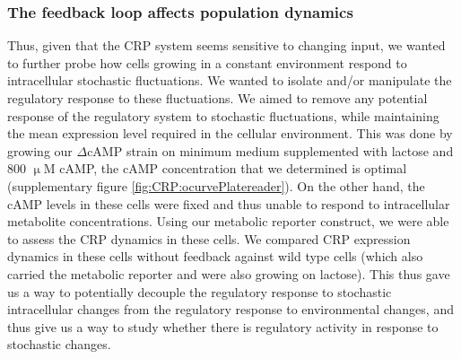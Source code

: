\subsubsection{The feedback loop affects population dynamics}

Thus, given that the CRP system seems sensitive to changing input, we wanted to further probe how cells growing in a constant environment respond to intracellular stochastic fluctuations.
%
%
We wanted to isolate and/or manipulate the regulatory response to these fluctuations.
%
We aimed to remove any potential response of the regulatory system to stochastic fluctuations, while maintaining the mean expression level 
required in the cellular environment.
%
This was done by growing our $\Delta$cAMP strain on minimum medium supplemented with lactose and 800 $\upmu$M cAMP,
the cAMP concentration that we determined is optimal (supplementary figure \ref{fig:CRP:ocurvePlatereader}).
%
On the other hand, the cAMP levels in these cells were fixed and thus unable to respond to intracellular metabolite concentrations.
%
Using our metabolic reporter construct, we were able to assess the CRP dynamics in these cells.
We compared CRP expression dynamics in these cells without feedback against wild type cells (which also carried the metabolic reporter and were also growing on lactose).
%
This thus gave us a way to potentially 
decouple the regulatory response to stochastic intracellular changes from the regulatory response to environmental changes,
and thus give us a way to study whether there is regulatory activity in response to stochastic changes.

